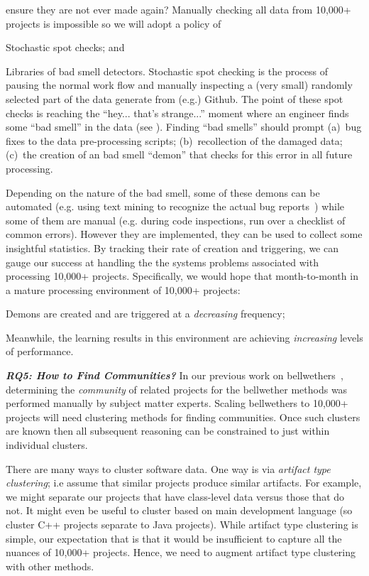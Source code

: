 ensure they are not ever made again?
Manually checking all data from 10,000+ projects  is impossible
so we will  adopt a policy of 
\bi
\item
Stochastic spot checks; and 
\item
Libraries of bad smell detectors.
\ei
Stochastic spot checking is the process of pausing the normal
work flow and manually inspecting a (very small) randomly selected part of the data  generate from (e.g.) Github. The point of these spot checks is  reaching the  ``hey... that's strange...'' moment where an  engineer finds some ``bad smell'' in the data (see ).  Finding ``bad smells'' should prompt
(a)~bug
fixes to the data pre-processing scripts;  (b)~recollection of the damaged data;
(c)~the creation of an  bad smell ``demon'' that checks for this  error  in all
future processing.

Depending on the nature of the bad smell, some of these demons can be automated (e.g. using text mining to recognize
the actual bug reports~\cite{Yu18q}) while some of them are manual
(e.g. during code inspections, run over a checklist of common errors). 
However they are implemented, they can be used
to collect some insightful  statistics.
By tracking their rate
of creation and triggering, we can gauge our success at handling the the systems problems associated with processing 10,000+ projects. Specifically, we would hope that month-to-month in a  mature
processing environment of 10,000+ projects:
\bi
\item
 Demons are created and are triggered at a {\em decreasing} frequency;
 \item
 Meanwhile, the learning results in this environment are achieving {\em increasing}
 levels of performance.
 \ei

 

 

 
\textit{\textbf{RQ5: How to Find Communities?}} In our previous
work on bellwethers~\cite{KrishnaMF16,krishna2018bellwethers},  determining the {\em community} of related projects for the bellwether methods was performed manually by   subject matter experts. Scaling bellwethers to 10,000+ projects will need  clustering methods for finding  communities. Once such clusters are known then all subsequent reasoning can be constrained to just within individual clusters.

There are many ways to cluster software data.
One way is via {\em artifact type clustering}; i.e assume that similar projects produce similar artifacts. For example, we might separate our projects that have class-level data  versus those that do not.
It might even be useful to cluster based on main development language (so cluster C++ projects separate to Java projects).
While artifact type clustering is simple, our expectation that is that it would be insufficient to capture all the nuances of 10,000+ projects.
Hence, we need to augment artifact type clustering with other methods. 

